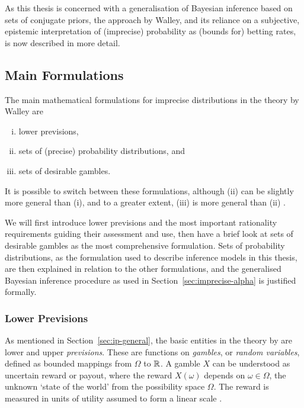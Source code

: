 As this thesis is concerned with a generalisation of Bayesian inference
based on sets of conjugate priors, the approach by Walley,
and its reliance on a subjective, epistemic interpretation of (imprecise) probability
as (bounds for) betting rates, is now described in more detail.


\subsection{Main Formulations}
\label{sec:ip-main}


The main mathematical formulations for imprecise distributions
in the theory by Walley \parencite*{1991:walley, 2000:walley::towards}
are
\begin{enumerate}[(i)]
\item lower previsions,
\item sets of (precise) probability distributions, and
\item sets of desirable gambles.
\end{enumerate}
It is possible to switch between these formulations,
although (ii) can be slightly more general than (i),
and to a greater extent, (iii) is more general than (ii) \parencite{2000:walley::towards}.

\medskip

We will first introduce lower previsions
and the most important rationality requirements guiding their assessment and use,
then have a brief look at sets of desirable gambles as the most comprehensive formulation.
Sets of probability distributions, as the formulation used to describe inference models in this thesis,
are then explained in relation to the other formulations,
and the generalised Bayesian inference procedure as used in Section~\ref{sec:imprecise-alpha} is justified formally.

\subsubsection{Lower Previsions}

As mentioned in Section~\ref{sec:ip-general}, the basic entities in the theory by \textcite{1991:walley}
are lower and upper \emph{previsions}.
These are functions on \emph{gambles}, or \emph{random variables},
defined as bounded mappings from $\Omega$ to $\mathbb{R}$.
A gamble $X$ can be understood as uncertain reward or payout,
where the reward $X(\omega)$ depends on $\omega \in \Omega$,
the unknown `state of the world' from the possibility space $\Omega$.
The reward is measured in units of utility assumed to form a linear scale
\parencite[\S 2.2]{1991:walley}.

